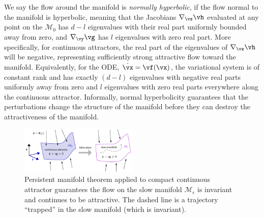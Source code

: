 \documentclass{article} %
\newcounter{ct}
\newcommand{\manifold}{\mathcal{M}}
\theoremstyle{definition}
\theoremstyle{remark}
\begin{document}
We say the flow around the manifold is \emph{normally hyperbolic}, if the flow normal to the manifold is hyperbolic, meaning that the Jacobians \(\nabla_{\vz} \vh\) evaluated at any point on the \(\manifold_{0}\) has \(d - l\) eigenvalues with their real part uniformly bounded away from zero, and \(\nabla_{\vy} \vg\) has \(l\) eigenvalues with zero real part.
More specifically, for continuous attractors, the real part of the eigenvalues of \(\nabla_{\vz} \vh\) will be negative, representing sufficiently strong attractive flow toward the manifold.
Equivalently, for the ODE, \(\dot{\vx} = \vf(\vx)\), the variational system is of constant rank and has exactly \((d - l)\) eigenvalues with negative real parts uniformly away from zero and \(l\) eigenvalues with zero real parts everywhere along the continuous attractor.
Informally, normal hyperbolicity guarantees that the perturbations change the structure of the manifold before they can destroy the attractiveness of the manifold.

\setlength\belowcaptionskip{-5ex}
\begin{figure}
  \centering
  \includegraphics[width=0.5\textwidth]{FenichelThm}
  \caption{
    Persistent manifold theorem applied to compact continuous attractor guarantees the flow on the slow manifold \(\manifold_{\epsilon}\) is invariant and continues to be attractive.
    The dashed line is a trajectory ``trapped'' in the slow manifold (which is invariant). %
  }\label{fig:fenichel}
\end{figure}
\end{document}
